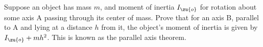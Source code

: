 Suppose an object has mass $m$, and moment of inertia $I_\zu{o}$ for rotation about some axis A
passing through its center of mass. Prove that for an axis B, parallel to A and lying at a distance $h$ from
it, the object's moment of inertia is given by $I_\zu{o}+mh^2$. This is known as the parallel axis theorem.
